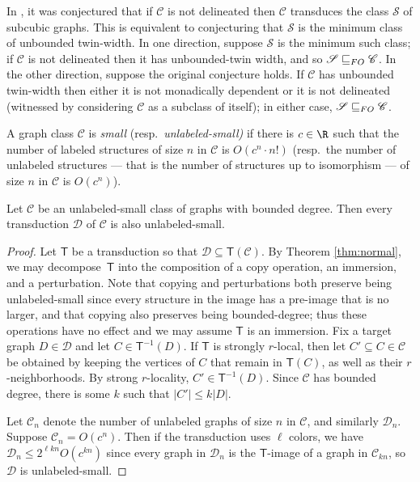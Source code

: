 \documentclass{lmcs}
\newcommand{\Cc}{\mathscr{C}}
\newcommand{\Dd}{\mathscr{D}}
\newcommand{\Ss}{\mathscr{S}}
\renewcommand{\FO}{{\rm FO}}
\theoremstyle{definition}
\begin{document}
In \cite[Conjecture 66]{bonnet2022twin8}, it was conjectured that if $\Cc$ is not delineated then $\Cc$ transduces the class $\Ss$ of subcubic graphs. This is equivalent to conjecturing that $\Ss$ is the minimum class of unbounded twin-width. In one direction, suppose $\Ss$ is the minimum such class; if $\Cc$ is not delineated then it has unbounded-twin width, and so $\Ss \sqsubseteq_\FO \Cc$. In the other direction, suppose the original conjecture holds. If $\Cc$ has unbounded twin-width then either it is not monadically dependent or it is not delineated (witnessed by considering $\Cc$ as a subclass of itself); in either case, $\Ss \sqsubseteq_\FO \Cc$.

\begin{defi}
	A graph class $\Cc$ is {\em small} (resp.\ {\em unlabeled-small)} if there is $c \in \R$ such that the number of labeled structures of size $n$ in $\Cc$ is $O(c^n \cdot n!)$ (resp.\ the number of unlabeled structures --- that is the number of structures up to isomorphism --- of size $n$ in $\Cc$ is $O(c^n)$).
\end{defi}

\begin{lem} \label{lem:bdsmall}
	Let $\Cc$ be an unlabeled-small class of graphs with bounded degree. Then every transduction $\Dd$ of $\Cc$ is also unlabeled-small.
\end{lem}
\begin{proof}
	Let $\mathsf T$ be a transduction so that $\Dd \subseteq \mathsf T(\Cc)$. By Theorem \ref{thm:normal}, we may decompose~$\mathsf T$ into the composition of a copy operation, an immersion, and a perturbation. Note that copying and perturbations both preserve being unlabeled-small since every structure in the image has a pre-image that is no larger, and that copying also preserves being bounded-degree; thus these operations have no effect and we may assume $\mathsf T$ is an immersion. Fix a target graph $D \in \Dd$ and let $C \in \mathsf T^{-1}(D)$. If $\mathsf T$ is strongly $r$-local, then let $C' \subseteq C \in \Cc$ be obtained by keeping the vertices of $C$ that remain in $\mathsf T(C)$, as well as their $r$-neighborhoods. By strong $r$-locality, $C' \in \mathsf T^{-1}(D)$. Since $\Cc$ has bounded degree, there is some $k$ such that $|C'| \leq k |D|$.
	
	Let $\Cc_n$ denote the number of unlabeled graphs of size $n$ in $\Cc$, and similarly $\Dd_n$. Suppose $\Cc_n = O(c^n)$. Then if the transduction uses $\ell$ colors, we have $\Dd_n \leq 2^{\ell kn} O(c^{kn})$ since every graph in $\Dd_n$ is the $\mathsf T$-image of a graph in $\Cc_{kn}$, so $\Dd$ is unlabeled-small.
\end{proof}
\end{document}
